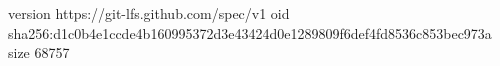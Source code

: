 version https://git-lfs.github.com/spec/v1
oid sha256:d1c0b4e1ccde4b160995372d3e43424d0e1289809f6def4fd8536c853bec973a
size 68757
